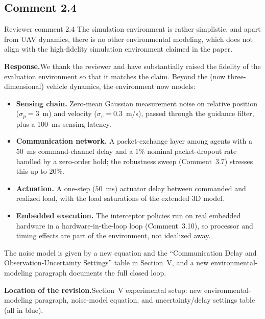 \documentclass[11pt]{article}
\newcommand{\rsp}{\medskip\noindent\textbf{Response.}\quad}
\newcommand{\loc}{\medskip\noindent\textbf{Location of the revision.}\quad}
\begin{document}
\subsection*{Comment 2.4 }

\begin{reviewercomment}{Reviewer comment 2.4}
The simulation environment is rather simplistic, and apart from UAV dynamics, there
is no other environmental modeling, which does not align with the high-fidelity
simulation environment claimed in the paper.
\end{reviewercomment}

\rsp We thank the reviewer and have substantially raised the fidelity of the
evaluation environment so that it matches the claim. Beyond the (now
three-dimensional) vehicle dynamics, the environment now models:
\begin{itemize}
  \item \textbf{Sensing chain.} Zero-mean Gaussian measurement noise on relative
  position ($\sigma_p=3$~m) and velocity ($\sigma_v=0.3$~m/s), passed through the
  guidance filter, plus a $100$~ms sensing latency.
  \item \textbf{Communication network.} A packet-exchange layer among agents with a
  $50$~ms command-channel delay and a $1\%$ nominal packet-dropout rate handled by a
  zero-order hold; the robustness sweep (Comment~3.7) stresses this up to $20\%$.
  \item \textbf{Actuation.} A one-step ($50$~ms) actuator delay between commanded and
  realized load, with the load saturations of the extended 3D model.
  \item \textbf{Embedded execution.} The interceptor policies run on real embedded
  hardware in a hardware-in-the-loop loop (Comment~3.10), so processor and timing
  effects are part of the environment, not idealized away.
\end{itemize}
The noise model is given by a new equation and the ``Communication Delay and
Observation-Uncertainty Settings'' table in Section~V, and a new environmental-modeling
paragraph documents the full closed loop.

\loc Section~V experimental setup: new environmental-modeling paragraph, noise-model
equation, and uncertainty/delay settings table (all in blue).

\end{document}
